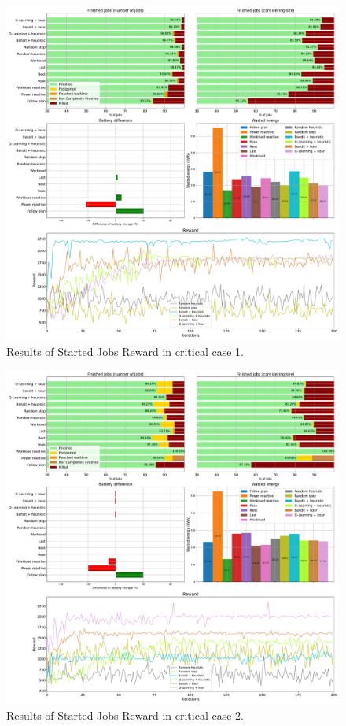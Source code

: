 \begin{figure}[!htb]
    \centering
    \includegraphics[scale=0.29]{Images/Learning_compensations/reward_started_profile_best_workload_1_with_noise_state_delta.pdf}
    \caption{Results of Started Jobs Reward in critical case 1.}
    \label{fig:started_reward_results_critical_1}
\end{figure}

\begin{figure}[!htb]
    \centering
    \includegraphics[scale=0.29]{Images/Learning_compensations/reward_started_profile_best_workload_2_with_noise_state_delta.pdf}
    \caption{Results of Started Jobs Reward in critical case 2.}
    \label{fig:started_reward_results_critical_2}
\end{figure}

